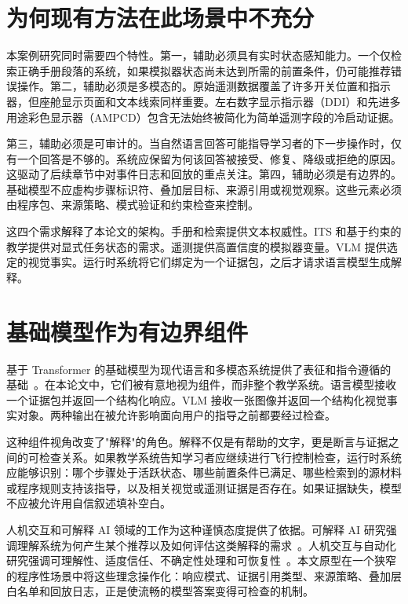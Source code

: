 \section{为何现有方法在此场景中不充分}\label{sec:bg-gap}

本案例研究同时需要四个特性。第一，辅助必须具有实时状态感知能力。一个仅检索正确手册段落的系统，如果模拟器状态尚未达到所需的前置条件，仍可能推荐错误操作。第二，辅助必须是多模态的。原始遥测数据覆盖了许多开关位置和指示器，但座舱显示页面和文本线索同样重要。左右数字显示指示器（DDI）和先进多用途彩色显示器（AMPCD）包含无法始终被简化为简单遥测字段的冷启动证据。

第三，辅助必须是可审计的。当自然语言回答可能指导学习者的下一步操作时，仅有一个回答是不够的。系统应保留为何该回答被接受、修复、降级或拒绝的原因。这驱动了后续章节中对事件日志和回放的重点关注。第四，辅助必须是有边界的。基础模型不应虚构步骤标识符、叠加层目标、来源引用或视觉观察。这些元素必须由程序包、来源策略、模式验证和约束检查来控制。

这四个需求解释了本论文的架构。手册和检索提供文本权威性。ITS 和基于约束的教学提供对显式任务状态的需求。遥测提供高置信度的模拟器变量。VLM 提供选定的视觉事实。运行时系统将它们绑定为一个证据包，之后才请求语言模型生成解释。

\section{基础模型作为有边界组件}\label{sec:bg-foundation}

基于 Transformer 的基础模型为现代语言和多模态系统提供了表征和指令遵循的基础~\citep{vaswani2017attention}。在本论文中，它们被有意地视为组件，而非整个教学系统。语言模型接收一个证据包并返回一个结构化响应。VLM 接收一张图像并返回一个结构化视觉事实对象。两种输出在被允许影响面向用户的指导之前都要经过检查。

这种组件视角改变了"解释"的角色。解释不仅是有帮助的文字，更是断言与证据之间的可检查关系。如果教学系统告知学习者应继续进行飞行控制检查，运行时系统应能够识别：哪个步骤处于活跃状态、哪些前置条件已满足、哪些检索到的源材料或程序规则支持该指导，以及相关视觉或遥测证据是否存在。如果证据缺失，模型不应被允许用自信叙述填补空白。

人机交互和可解释 AI 领域的工作为这种谨慎态度提供了依据。可解释 AI 研究强调理解系统为何产生某个推荐以及如何评估这类解释的需求~\citep{gunning2019xai,hoffman2018metrics}。人机交互与自动化研究强调可理解性、适度信任、不确定性处理和可恢复性~\citep{lee2004trust,amershi2019guidelines}。本文原型在一个狭窄的程序性场景中将这些理念操作化：响应模式、证据引用类型、来源策略、叠加层白名单和回放日志，正是使流畅的模型答案变得可检查的机制。

